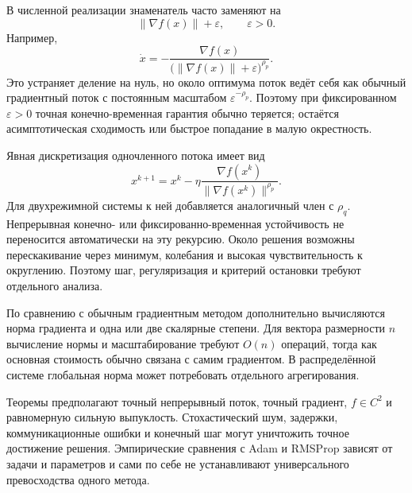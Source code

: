 В численной реализации знаменатель часто заменяют на
\[
    \lVert\nabla f(x)\rVert+\varepsilon,
    \qquad
    \varepsilon>0.
\]
Например,
\[
    \dot x
    =
    -\frac{\nabla f(x)}
    {\bigl(\lVert\nabla f(x)\rVert+\varepsilon\bigr)^{\rho_p}}.
\]
Это устраняет деление на нуль, но около оптимума поток ведёт себя как
обычный градиентный поток с постоянным масштабом
\(\varepsilon^{-\rho_p}\). Поэтому при фиксированном
\(\varepsilon>0\) точная конечно-временная гарантия обычно теряется;
остаётся асимптотическая сходимость или быстрое попадание в малую
окрестность.

Явная дискретизация одночленного потока имеет вид
\[
    x^{k+1}
    =
    x^k
    -\eta
    \frac{\nabla f(x^k)}
    {\lVert\nabla f(x^k)\rVert^{\rho_p}}.
\]
Для двухрежимной системы к ней добавляется аналогичный член с
\(\rho_q\). Непрерывная конечно- или фиксированно-временная
устойчивость не переносится автоматически на эту рекурсию. Около
решения возможны перескакивание через минимум, колебания и высокая
чувствительность к округлению. Поэтому шаг, регуляризация и критерий
остановки требуют отдельного анализа.

По сравнению с обычным градиентным методом дополнительно вычисляются
норма градиента и одна или две скалярные степени. Для вектора
размерности \(n\) вычисление нормы и масштабирование требуют
\(O(n)\) операций, тогда как основная стоимость обычно связана с
самим градиентом. В распределённой системе глобальная норма может
потребовать отдельного агрегирования.

Теоремы предполагают точный непрерывный поток, точный градиент,
\(f\in C^2\) и равномерную сильную выпуклость. Стохастический шум,
задержки, коммуникационные ошибки и конечный шаг могут уничтожить
точное достижение решения. Эмпирические сравнения с Adam и RMSProp зависят от задачи и параметров и сами по себе не устанавливают универсального превосходства одного метода.

